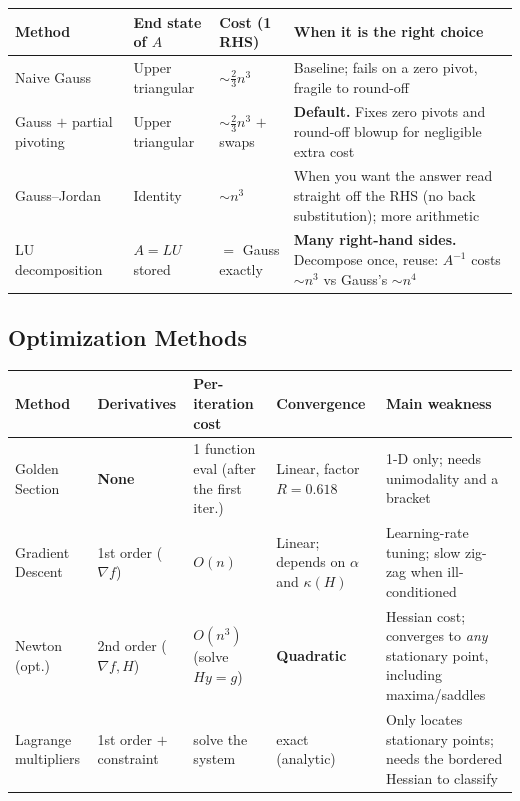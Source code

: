 \begin{center}\small
\renewcommand{\arraystretch}{1.4}
\begin{tabular}{@{}p{}p{}p{}p{}@{}}
\toprule
\textbf{Method} & \textbf{End state of $A$} & \textbf{Cost (1 RHS)} & \textbf{When it is the right choice} \\
\midrule
Naive Gauss & Upper triangular & $\sim\tfrac23n^3$ & Baseline; fails on a zero pivot, fragile to round-off \\
Gauss $+$ partial pivoting & Upper triangular & $\sim\tfrac23n^3$ $+$ swaps & \textbf{Default.} Fixes zero pivots and round-off blowup for negligible extra cost \\
Gauss--Jordan & Identity & $\sim n^3$ & When you want the answer read straight off the RHS (no back substitution); more arithmetic \\
LU decomposition & $A=LU$ stored & $=$ Gauss exactly & \textbf{Many right-hand sides.} Decompose once, reuse: $A^{-1}$ costs $\sim n^3$ vs Gauss's $\sim n^4$ \\
\bottomrule
\end{tabular}
\end{center}

\subsection{Optimization Methods}

\begin{center}\small
\renewcommand{\arraystretch}{1.4}
\begin{tabular}{@{}p{}p{}p{}p{}p{}@{}}
\toprule
\textbf{Method} & \textbf{Derivatives} & \textbf{Per-iteration cost} & \textbf{Convergence} & \textbf{Main weakness} \\
\midrule
Golden Section & \textbf{None} & 1 function eval (after the first iter.) & Linear, factor $R=0.618$ & 1-D only; needs unimodality and a bracket \\
Gradient Descent & 1st order ($\nabla f$) & $O(n)$ & Linear; depends on $\alpha$ and $\kappa(H)$ & Learning-rate tuning; slow zig-zag when ill-conditioned \\
Newton (opt.) & 2nd order ($\nabla f, H$) & $O(n^3)$ (solve $Hy=g$) & \textbf{Quadratic} & Hessian cost; converges to \emph{any} stationary point, including maxima/saddles \\
Lagrange multipliers & 1st order $+$ constraint & solve the system & exact (analytic) & Only locates stationary points; needs the bordered Hessian to classify \\
\bottomrule
\end{tabular}
\end{center}


